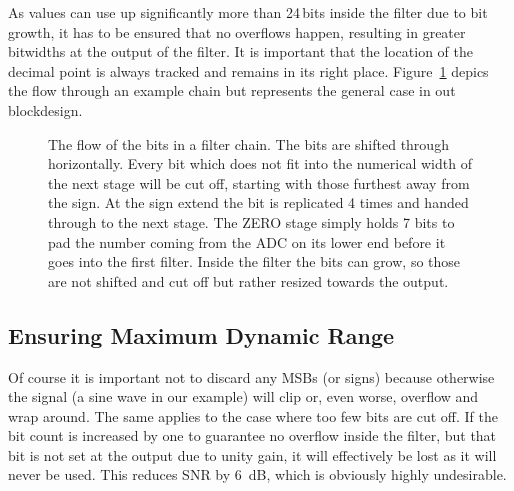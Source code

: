 As values can use up significantly  more than \num{24}\,bits inside the filter
due to bit growth, it has to be ensured that no overflows happen, resulting in
greater  bitwidths at  the output  of the  filter.  It  is important  that the
location  of the  decimal point  is always  tracked and  remains in  its right
place.  Figure~\ref{fig:fpga:bitflow} depics the flow through an example chain
but represents the general case in out blockdesign.

\begin{figure}
    \centering
    
    \caption[Bit Flow in Filter Chain]{%
        The flow of  the bits in a filter chain. The  bits are shifted through
        horizontally. Every bit which does not fit into the numerical width of
        the next stage will be cut off, starting with those furthest away from
        the sign. At the  sign extend the bit is replicated  \num{4} times and
        handed through to the next  stage. The ZERO stage simply holds \num{7}
         bits to pad the number coming from the ADC on its lower end
        before it goes  into the first filter. Inside the filter  the bits can
        grow, so those are not shifted  and cut off but rather resized towards
        the output.%
    }
    \label{fig:fpga:bitflow}
\end{figure}

%
%
\subsection{Ensuring Maximum Dynamic Range} %
\label{subsec:fpga:maximize_dynamic_range}

Of course it is important not to discard any MSBs (or signs) because otherwise
the signal (a sine wave in our example) will clip or, even worse, overflow and
wrap around. The same applies  to the case where too few  bits are cut off. If
the bit count is increased by one  to guarantee no overflow inside the filter,
but that bit is  not set at the output due to unity  gain, it will effectively
be lost as it  will never be used.  This reduces SNR  by \SI{6}{\dB}, which is
obviously highly undesirable.

